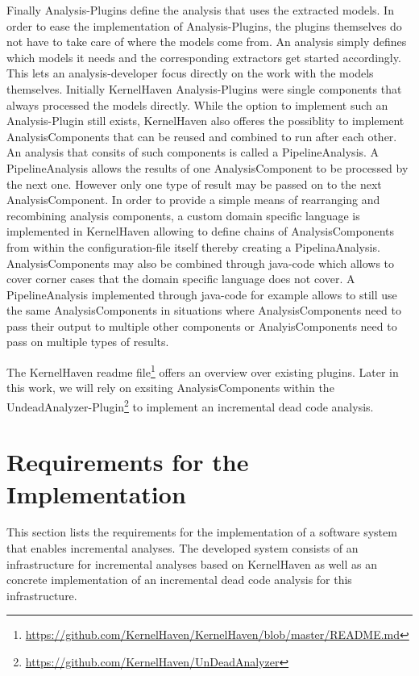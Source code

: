 \documentclass[a4paper]{article}
\begin{document}
Finally Analysis-Plugins define the analysis that uses the extracted models. In order to ease the implementation of Analysis-Plugins, the plugins themselves do not have to take care of where the models come from. An analysis simply defines which models it needs and the corresponding extractors get started accordingly. This lets an analysis-developer focus directly on the work with the models themselves. Initially KernelHaven Analysis-Plugins  were single components that always processed the models directly. While the option to implement such an Analysis-Plugin still exists, KernelHaven also offeres the possiblity to implement AnalysisComponents that can be reused and combined to run after each other. An analysis that consits of such components is called a PipelineAnalysis. A PipelineAnalysis allows the results of one AnalysisComponent to be processed by the next one.  However only one type of result may be passed on to the next AnalysisComponent. In order to provide a simple means of rearranging and recombining analysis components, a custom domain specific language is implemented in KernelHaven allowing to define chains of AnalysisComponents from within the configuration-file itself thereby creating a PipelinaAnalysis. AnalysisComponents may also be combined through java-code which allows to cover corner cases that the domain specific language does not cover. A PipelineAnalysis implemented through java-code for example allows to still use the same AnalysisComponents in situations where  AnalysisComponents need to pass their output to multiple other components or AnalyisComponents need to pass on multiple types of results.

The KernelHaven readme file\footnote{\url{https://github.com/KernelHaven/KernelHaven/blob/master/README.md}} offers an overview over existing plugins. Later in this work, we will rely on exsiting AnalysisComponents within the UndeadAnalyzer-Plugin\footnote{\url{https://github.com/KernelHaven/UnDeadAnalyzer}} to implement an incremental dead code analysis. 

\newpage
\section{Requirements for the Implementation} \label{requirements}

This section lists the requirements for the implementation of a software system that enables incremental analyses. The developed system consists of an infrastructure for incremental analyses based on KernelHaven as well as an concrete implementation of an incremental dead code analysis for this infrastructure.
\end{document}
